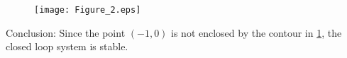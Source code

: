 \begin{enumerate}[label=\thesubsection.\arabic*.,ref=\thesubsection.\theenumi]
\begin{figure}[!h]
  \texttt{[image: Figure\_2.eps]}
  \label{fig:Polar_Plot}
\end{figure}

Conclusion: Since the point $(-1,0)$ is not enclosed by the contour in \ref{fig:Polar_Plot}, the closed loop system is stable.
%
\end{enumerate}
